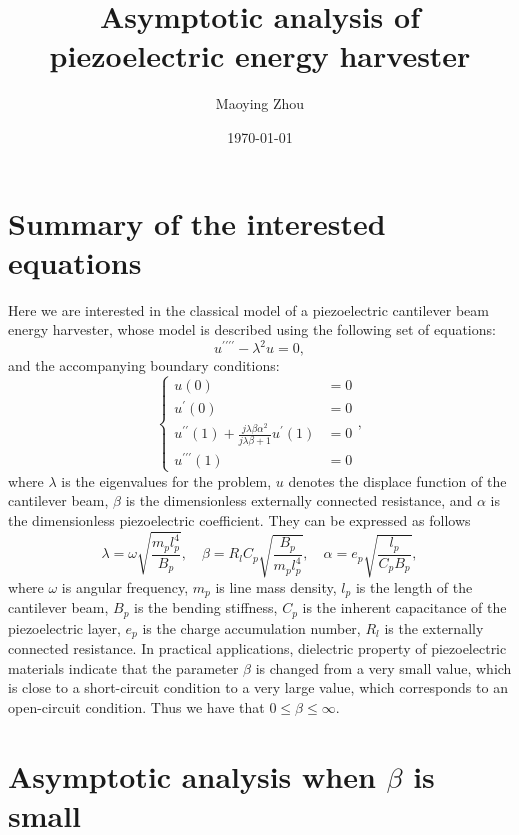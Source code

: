 \documentclass{article}
\title{Asymptotic analysis of piezoelectric energy harvester}
\author{Maoying Zhou}
\date{\today}
\begin{document}
\maketitle


\section{Summary of the interested equations}

Here we are interested in the classical model of a piezoelectric cantilever beam energy harvester, whose model is described using the following set of equations:
\begin{equation}
    u^{\prime\prime\prime\prime} - \lambda^2 u = 0,
\end{equation}
and the accompanying boundary conditions:
\begin{equation}
    \left\{\begin{aligned}
        u(0) &= 0 \\
        u^\prime(0) &= 0 \\
        u^{\prime\prime}(1) + \frac{j\lambda \beta \alpha^2}{ j\lambda \beta + 1 } u^\prime(1) &= 0 \\
        u^{\prime\prime\prime}(1) &= 0
    \end{aligned}\right.,
\end{equation}
where $\lambda$ is the eigenvalues for the problem, $u$ denotes the displace function of the cantilever beam, $\beta$ is the dimensionless externally connected resistance, and $\alpha$ is the dimensionless piezoelectric coefficient. They can be expressed as follows
\begin{equation}
    \lambda = \omega \sqrt{ \frac{ m_p l_p^4 }{ B_p } }, \quad \beta = R_l C_p \sqrt{\frac{B_p}{m_p l_p^4}}, \quad \alpha = e_p \sqrt{\frac{l_p}{C_p B_p}},
\end{equation}
where $\omega$ is angular frequency, $m_p$ is line mass density, $l_p$ is the length of the cantilever beam, $B_p$ is the bending stiffness, $C_p$ is the inherent capacitance of the piezoelectric layer, $e_p$ is the charge accumulation number, $R_l$ is the externally connected resistance. In practical applications, dielectric property of piezoelectric materials indicate that the parameter $\beta$ is changed from a very small value, which is close to a short-circuit condition to a very large value, which corresponds to an open-circuit condition. Thus we have that $0 \leq \beta \leq \infty$. 


\section{Asymptotic analysis when $\beta$ is small}
\end{document}

